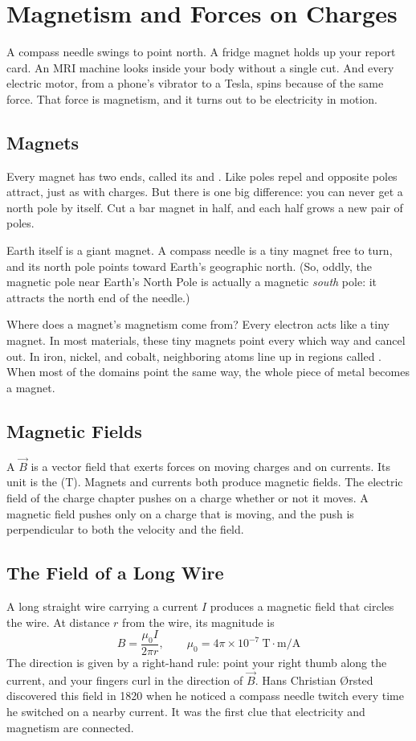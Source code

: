 \chapter{Magnetism and Forces on Charges}

A compass needle swings to point north. A fridge magnet holds up your
report card. An MRI machine looks inside your body without a single cut.
And every electric motor, from a phone's vibrator to a Tesla, spins
because of the same force. That force is magnetism, and it turns out to be
electricity in motion.

\section{Magnets}
Every magnet has two ends, called its  and
. Like poles repel and opposite poles attract, just as
with charges. But there is one big difference: you can never get a north
pole by itself. Cut a bar magnet in half, and each half grows a new pair
of poles.

Earth itself is a giant magnet. A compass needle is a tiny magnet free to
turn, and its north pole points toward Earth's geographic north. (So, oddly,
the magnetic pole near Earth's North Pole is actually a magnetic
\emph{south} pole: it attracts the north end of the needle.)

Where does a magnet's magnetism come from? Every electron acts like a
tiny magnet. In most materials, these tiny magnets point every which way
and cancel out. In iron, nickel, and cobalt, neighboring atoms line up in
regions called . When most of the domains point the same
way, the whole piece of metal becomes a magnet.

\section{Magnetic Fields}
A  $\vec{B}$ is a vector field that exerts forces on moving charges and on
currents. Its unit is the  (T). Magnets and currents both produce magnetic fields.
The electric field of the charge chapter pushes on a charge whether or not it moves. A magnetic field
pushes only on a charge that is moving, and the push is perpendicular to both the velocity and the field.

\section{The Field of a Long Wire}
A long straight wire carrying a current $I$ produces a magnetic field that circles the wire. At distance $r$ from the wire,
its magnitude is
$$B = \frac{\mu_0 I}{2\pi r}, \qquad \mu_0 = 4\pi \times 10^{-7}\ \text{T}\cdot\text{m/A}$$
The direction is given by a right-hand rule: point your right thumb along
the current, and your fingers curl in the direction of $\vec{B}$. Hans
Christian {\O}rsted discovered this field in 1820 when he noticed a compass
needle twitch every time he switched on a nearby current. It was the first
clue that electricity and magnetism are connected.

